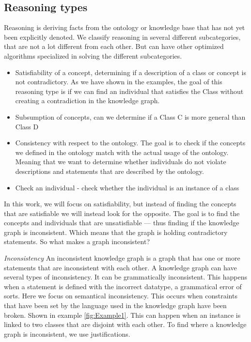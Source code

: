 \documentclass[11pt,letterpaper ,oneside ]{book}
\begin{document}
	\subsection{Reasoning types}
	Reasoning is deriving facts from the ontology or knowledge base that has not yet been explicitly denoted. We classify reasoning in several different subcategories, that are not a lot different from each other. But can have other optimized algorithms specialized in solving the different subcategories.
	\begin{itemize}
		\item Satisfiability of a concept, determining if a description of a class or concept is not contradictory. As we have shown in the examples, the goal of this reasoning type is if we can find an individual that satisfies the Class without creating a contradiction in the knowledge graph. 
		\item Subsumption of concepts, can we determine if a Class C is more general than Class D
		\item Consistency with respect to the ontology. The goal is to check if the concepts we defined in the ontology match with the actual usage of the ontology. Meaning that we want to determine whether individuals do not violate descriptions and statements that are described by the ontology.
		\item Check an individual - check whether the individual is an instance of a class
	\end{itemize}
	In this work, we will focus on satisfiability, but instead of finding the concepts that are satisfiable we will instead look for the opposite. The goal is to find the concepts and individuals that are unsatisfiable — thus finding if the knowledge graph is inconsistent. Which means that the graph is holding contradictory statements. So what makes a graph inconsistent?
	
	\textit{Inconsistency} An inconsistent knowledge graph is a graph that has one or more statements that are inconsistent with each other. A knowledge graph can have several types of inconsistency. It can be grammatically inconsistent. This happens when a statement is defined with the incorrect datatype, a grammatical error of sorts. Here we focus on semantical inconsistency. This occurs when constraints that have been set by the language used in the knowledge graph have been broken. Shown in example \ref{fig:Example1}. This can happen when an instance is linked to two classes that are disjoint with each other. To find where a knowledge graph is inconsistent, we use justifications.   
	
\end{document}
